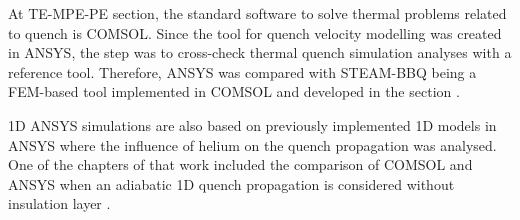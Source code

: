 
At TE-MPE-PE section, the standard software to solve thermal problems related to quench is COMSOL. Since the tool for quench velocity modelling was created in ANSYS, the  step was to cross-check thermal quench simulation analyses with a reference tool. Therefore, ANSYS was compared with STEAM-BBQ being a FEM-based tool implemented in COMSOL and developed in the section \cite{BBQ_manual}.

1D ANSYS simulations are also based on previously implemented 1D models in ANSYS where the influence of helium on the quench propagation was analysed. One of the chapters of that work included the comparison of COMSOL and ANSYS when an adiabatic 1D quench propagation is considered without insulation layer \cite{paudel_thesis}. 

